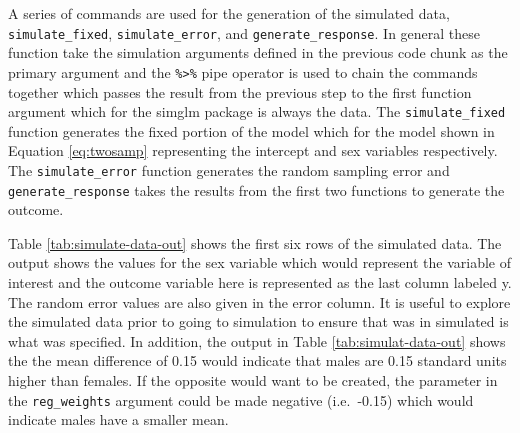 \documentclass[man,mask,floatsintext]{apa6}
\newenvironment{Shaded}{\begin{snugshade}}{\end{snugshade}}
\newcommand{\DataTypeTok}[1]{\textcolor[rgb]{0.13,0.29,0.53}{#1}}
\newcommand{\KeywordTok}[1]{\textcolor[rgb]{0.13,0.29,0.53}{\textbf{#1}}}
\newcommand{\NormalTok}[1]{#1}
\newcommand{\OperatorTok}[1]{\textcolor[rgb]{0.81,0.36,0.00}{\textbf{#1}}}
\newcommand{\OtherTok}[1]{\textcolor[rgb]{0.56,0.35,0.01}{#1}}
\newcommand{\StringTok}[1]{\textcolor[rgb]{0.31,0.60,0.02}{#1}}
\begin{document}
A series of commands are used for the generation of the simulated data, \texttt{simulate\_fixed}, \texttt{simulate\_error}, and \texttt{generate\_response}. In general these function take the simulation arguments defined in the previous code chunk as the primary argument and the \texttt{\%\textgreater{}\%} pipe operator is used to chain the commands together which passes the result from the previous step to the first function argument which for the simglm package is always the data. The \texttt{simulate\_fixed} function generates the fixed portion of the model which for the model shown in Equation \eqref{eq:twosamp} representing the intercept and sex variables respectively. The \texttt{simulate\_error} function generates the random sampling error and \texttt{generate\_response} takes the results from the first two functions to generate the outcome.

\begin{Shaded}
\end{Shaded}

Table \ref{tab:simulate-data-out} shows the first six rows of the simulated data. The output shows the values for the sex variable which would represent the variable of interest and the outcome variable here is represented as the last column labeled y. The random error values are also given in the error column. It is useful to explore the simulated data prior to going to simulation to ensure that was in simulated is what was specified. In addition, the output in Table \ref{tab:simulat-data-out} shows the the mean difference of 0.15 would indicate that males are 0.15 standard units higher than females. If the opposite would want to be created, the parameter in the \texttt{reg\_weights} argument could be made negative (i.e.~-0.15) which would indicate males have a smaller mean.
\end{document}

